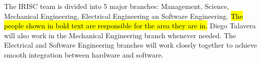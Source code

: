 The IRISC team is divided into 5 major branches: Management, Science, Mechanical Engineering, Electrical Engineering an Software Engineering. \hl{The people shown in bold text are responsible for the area they are in.} Diego Talavera will also work in the Mechanical Engineering branch whenever needed. The Electrical and Software Engineering branches will work closely together to achieve smooth integration between hardware and software.

